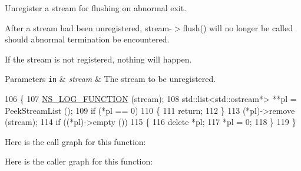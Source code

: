 Unregister a stream for flushing on abnormal exit. 

After a stream had been unregistered, {\ttfamily stream-\/$>$flush()} will no longer be called should abnormal termination be encountered.

If the stream is not registered, nothing will happen.


\begin{DoxyParams}[1]{Parameters}
\mbox{\tt in}  & {\em stream} & The stream to be unregistered. \\
\hline
\end{DoxyParams}

\begin{DoxyCode}
106 \{
107   \hyperlink{log-macros-disabled_8h_a90b90d5bad1f39cb1b64923ea94c0761}{NS\_LOG\_FUNCTION} (stream);
108   std::list<std::ostream*> **pl = PeekStreamList ();
109   \textcolor{keywordflow}{if} (*pl == 0)
110     \{
111       \textcolor{keywordflow}{return};
112     \}
113   (*pl)->remove (stream);
114   \textcolor{keywordflow}{if} ((*pl)->empty ())
115     \{
116       \textcolor{keyword}{delete} *pl;
117       *pl = 0;
118     \}
119 \}
\end{DoxyCode}


Here is the call graph for this function\+:




Here is the caller graph for this function\+:


